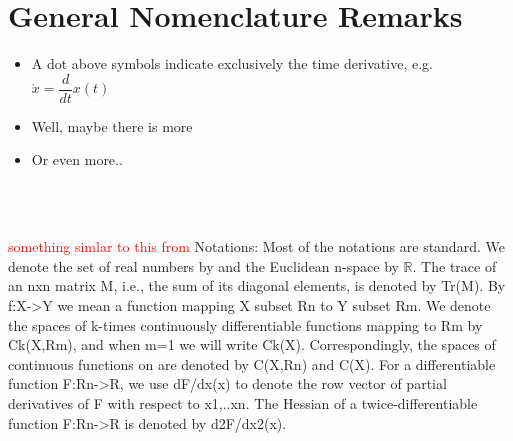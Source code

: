 \section*{General Nomenclature Remarks}
\vspace{0.1cm}
\begin{itemize}
\item A dot above symbols indicate exclusively the time derivative, e.g. $\dot{x} = \dfrac{d}{dt}x(t)$
\item Well, maybe there is more
\item Or even more..
\end{itemize}

\textcolor{white}{\gls{analytic_func} \gls{rational_func} \gls{proper_func} \gls{injective_func} \gls{surjective_func} \gls{bijective_func} \gls{lipschitz} \gls{compact_space} \gls{hurwitz} \gls{dimension} \gls{extrinsic} \gls{intrinsic}}


\textcolor{red}{something simlar to this from \citep{bib:barrier_prajna}}
Notations: Most of the notations are standard. We denote
the set of real numbers by and the Euclidean n-space by $\mathbb{R}$.
The trace of an nxn matrix M, i.e., the sum of its diagonal elements,
is denoted by Tr(M). By f:X->Y we mean a function
mapping X subset Rn to Y subset Rm. We denote the spaces of
k-times continuously differentiable functions mapping
to Rm by Ck(X,Rm), and when m=1 we will write Ck(X).
Correspondingly, the spaces of continuous functions on are
denoted by C(X,Rn) and C(X). For a differentiable function
F:Rn->R, we use dF/dx(x) to denote the row vector
of partial derivatives of F with respect to x1,..xn. The Hessian
of a twice-differentiable function F:Rn->R is denoted
by d2F/dx2(x).